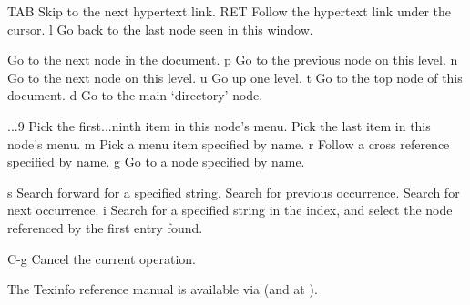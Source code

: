\infokey TAB         Skip to the next hypertext link.\cr
\infokey RET         Follow the hypertext link under the cursor.\cr
\infokey l           Go back to the last node seen in this window.\cr

           Go to the next node in the document.\cr
\infokey p           Go to the previous node on this level.\cr
\infokey n           Go to the next node on this level.\cr
\infokey u           Go up one level.\cr
\infokey t           Go to the top node of this document.\cr
\infokey d           Go to the main `directory' node.\cr

...9       Pick the first...ninth item in this node's menu.\cr
{}           Pick the last item in this node's menu.\cr
\infokey m           Pick a menu item specified by name.\cr
\infokey r           Follow a cross reference specified by name.\cr
\infokey g           Go to a node specified by name.\cr

\infokey s           Search forward for a specified string.\cr
\infokey \lbracechar{}           Search for previous occurrence.\cr
\infokey \rbracechar{}           Search for next occurrence.\cr
\infokey i           Search for a specified string in the index, and\cr
\infokey {}              select the node referenced by the first entry found.\cr

\infokey C-g         Cancel the current operation.\cr
\endinfokeys

The Texinfo reference manual is available via \hfil\break
(and at ).

\copyrightnotice
\bye
